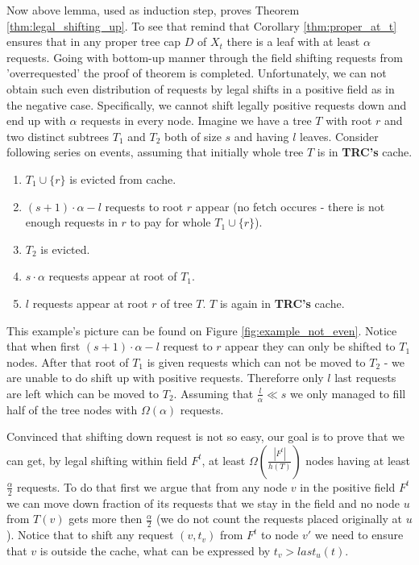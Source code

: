 Now above lemma, used as induction step, proves Theorem 
\ref{thm:legal_shifting_up}. To see that remind that 
Corollary \ref{thm:proper_at_t} ensures that in any proper tree cap $D$ of 
$X_t$ there is a leaf with at least $\alpha$ requests. Going with bottom-up 
manner through the field shifting requests from 'overrequested' the proof of 
theorem is completed.   
Unfortunately, we can not obtain such even distribution of requests by legal 
shifts in a positive field as in the negative case. Specifically, we cannot 
shift legally positive requests down and end up with $\alpha$ requests in every 
node. Imagine we have a tree $T$ with root $r$ and two distinct subtrees $T_1$ 
and $T_2$ both of size $s$ and having $l$ leaves. Consider following series on 
events, assuming that initially whole tree $T$ is in \textbf{TRC's} cache.
\begin{enumerate}
 \item $T_1 \cup \{r\}$ is evicted from cache.
 \item $(s+1) \cdot \alpha - l$ requests to root $r$ appear (no fetch occures - 
there is not enough requests in $r$ to pay for whole $T_1 \cup \{r\}$).
 \item $T_2$ is evicted.
 \item $s \cdot \alpha$ requests appear at root of $T_1$.
 \item $l$ requests appear at root $r$ of tree $T$. $T$ is again in 
\textbf{TRC's} cache.
\end{enumerate}
This example's picture can be found on Figure \ref{fig:example_not_even}. 
Notice that when first $(s+1) \cdot \alpha - l$ request to $r$ appear they can 
only be shifted to $T_1$ nodes. After that root of $T_1$ is given requests 
which can not be moved to $T_2$ - we are unable to do shift up with positive 
requests. Thereforre only $l$ last requests are left which can be moved to 
$T_2$. Assuming that $\frac{l}{\alpha} \ll s$ we only managed to fill half of 
the tree nodes with $\Omega(\alpha)$ requests.   

Convinced that shifting down request is not so easy, our goal is to prove that 
we can get, by legal shifting within field $F^t$, 
at least $\Omega(\frac{|F^t|}{h(T)})$ nodes having at least $\frac{\alpha}{2}$ 
requests. To do that first we argue that from any node $v$ in the positive 
field $F^t$ we can move down fraction of its requests that we stay in the field 
and no node $u$ from $T(v)$ gets more then $\frac{\alpha}{2}$ (we do not count 
the requests placed originally at $u$). Notice that to shift any request $(v, 
t_v)$ from $F^t$ to node $v'$ we need to ensure that $v$ is outside the cache, 
what can be expressed by $t_v > last_u(t)$.

